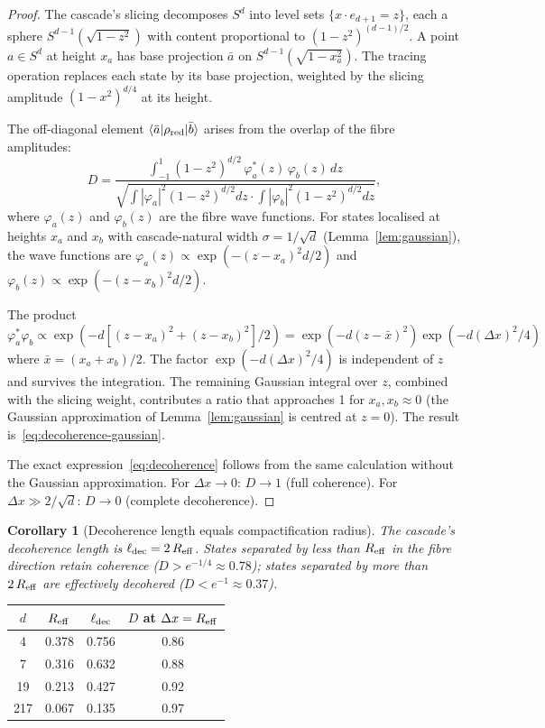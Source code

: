 \documentclass[12pt,a4paper]{article}
\newtheorem{corollary}[theorem]{Corollary}
\begin{document}
\begin{proof}
The cascade's slicing decomposes $S^d$ into level sets $\{x\cdot e_{d+1}=z\}$, each a
sphere $S^{d-1}(\sqrt{1-z^2})$ with content proportional to $(1-z^2)^{(d-1)/2}$. A point
$a\in S^d$ at height $x_a$ has base projection $\bar{a}$ on $S^{d-1}(\sqrt{1-x_a^2})$.
The tracing operation replaces each state by its base projection, weighted by the slicing
amplitude $(1-x^2)^{d/4}$ at its height.

The off-diagonal element $\langle\bar{a}|\rho_{\rm red}|\bar{b}\rangle$ arises from the
overlap of the fibre amplitudes:
\[
D = \frac{\int_{-1}^{1}(1-z^2)^{d/2}\,\varphi_a^*(z)\,\varphi_b(z)\,dz}
{\sqrt{\int|\varphi_a|^2(1-z^2)^{d/2}dz\cdot\int|\varphi_b|^2(1-z^2)^{d/2}dz}},
\]
where $\varphi_a(z)$ and $\varphi_b(z)$ are the fibre wave functions. For states localised
at heights $x_a$ and $x_b$ with cascade-natural width $\sigma = 1/\sqrt{d}$
(Lemma~\ref{lem:gaussian}), the wave functions are
$\varphi_a(z)\propto\exp(-(z-x_a)^2 d/2)$ and
$\varphi_b(z)\propto\exp(-(z-x_b)^2 d/2)$.

The product $\varphi_a^*\varphi_b\propto\exp(-d[(z-x_a)^2+(z-x_b)^2]/2)
= \exp(-d(z-\bar{x})^2)\exp(-d(\Delta x)^2/4)$ where $\bar{x}=(x_a+x_b)/2$.
The factor $\exp(-d(\Delta x)^2/4)$ is independent of $z$ and survives the integration.
The remaining Gaussian integral over $z$, combined with the slicing weight, contributes a
ratio that approaches 1 for $x_a,x_b\approx 0$ (the Gaussian approximation of
Lemma~\ref{lem:gaussian} is centred at $z=0$). The result
is~\eqref{eq:decoherence-gaussian}.

The exact expression~\eqref{eq:decoherence} follows from the same calculation without the
Gaussian approximation. For $\Delta x\to 0$: $D\to 1$ (full coherence). For
$\Delta x \gg 2/\sqrt{d}$: $D\to 0$ (complete decoherence).
\end{proof}

\begin{corollary}[Decoherence length equals compactification radius]\label{cor:dec-length}
The cascade's decoherence length is $\ell_{\rm dec} = 2\,R_{\rm eff}$. States separated by
less than $R_{\rm eff}$ in the fibre direction retain coherence ($D > e^{-1/4}\approx 0.78$);
states separated by more than $2\,R_{\rm eff}$ are effectively decohered
($D < e^{-1}\approx 0.37$).
\end{corollary}

\begin{center}
\renewcommand{\arraystretch}{1.2}
\begin{tabular}{cccc}
\toprule
$d$ & $R_{\rm eff}$ & $\ell_{\rm dec}$ & $D$ at $\Delta x = R_{\rm eff}$ \\
\midrule
4   & 0.378 & 0.756 & 0.86 \\
7   & 0.316 & 0.632 & 0.88 \\
19  & 0.213 & 0.427 & 0.92 \\
217 & 0.067 & 0.135 & 0.97 \\
\bottomrule
\end{tabular}
\end{center}
\end{document}
